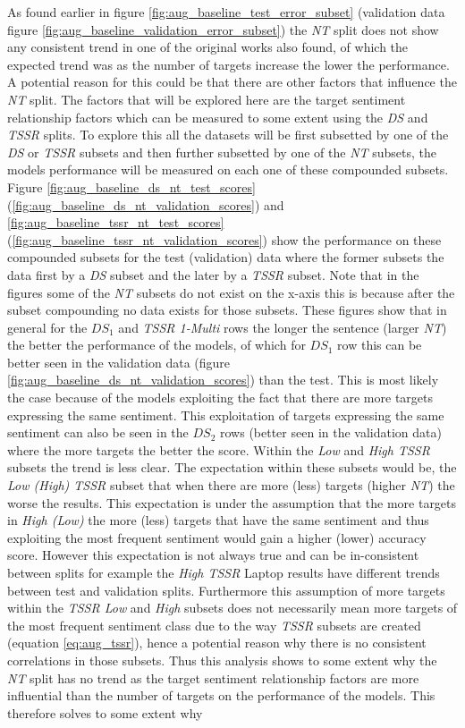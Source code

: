 As found earlier in figure \ref{fig:aug_baseline_test_error_subset} (validation data figure \ref{fig:aug_baseline_validation_error_subset}) the \textit{NT} split does not show any consistent trend in one of the original works \citep{aug_zhang2019aspectbased} also found, of which the expected trend was as the number of targets increase the lower the performance. A potential reason for this could be that there are other factors that influence the \textit{NT} split. The factors that will be explored here are the target sentiment relationship factors which can be measured to some extent using the \textit{DS} and \textit{TSSR} splits. To explore this all the datasets will be first subsetted by one of the \textit{DS} or \textit{TSSR} subsets and then further subsetted by one of the \textit{NT} subsets, the models performance will be measured on each one of these compounded subsets. Figure \ref{fig:aug_baseline_ds_nt_test_scores} (\ref{fig:aug_baseline_ds_nt_validation_scores}) and \ref{fig:aug_baseline_tssr_nt_test_scores} (\ref{fig:aug_baseline_tssr_nt_validation_scores}) show the performance on these compounded subsets for the test (validation) data where the former subsets the data first by a \textit{DS} subset and the later by a \textit{TSSR} subset. Note that in the figures some of the \textit{NT} subsets do not exist on the x-axis this is because after the subset compounding no data exists for those subsets. These figures show that in general for the $DS_1$ and \textit{TSSR 1-Multi} rows the longer the sentence (larger \textit{NT}) the better the performance of the models, of which for $DS_1$ row this can be better seen in the validation data (figure \ref{fig:aug_baseline_ds_nt_validation_scores}) than the test. This is most likely the case because of the models exploiting the fact that there are more targets expressing the same sentiment. This exploitation of targets expressing the same sentiment can also be seen in the $DS_2$ rows (better seen in the validation data) where the more targets the better the score. Within the \textit{Low} and \textit{High TSSR} subsets the trend is less clear. The expectation within these subsets would be, the \textit{Low (High) TSSR} subset that when there are more (less) targets (higher \textit{NT}) the worse the results. This expectation is under the assumption that the more targets in \textit{High (Low)} the more (less) targets that have the same sentiment and thus exploiting the most frequent sentiment would gain a higher (lower) accuracy score. However this expectation is not always true and can be in-consistent between splits for example the \textit{High TSSR} Laptop results have different trends between test and validation splits. Furthermore this assumption of more targets within the \textit{TSSR Low} and \textit{High} subsets does not necessarily mean more targets of the most frequent sentiment class due to the way \textit{TSSR} subsets are created (equation \ref{eq:aug_tssr}), hence a potential reason why there is no consistent correlations in those subsets. Thus this analysis shows to some extent why the \textit{NT} split has no trend as the target sentiment relationship factors are more influential than the number of targets on the performance of the models. This therefore solves to some extent why 